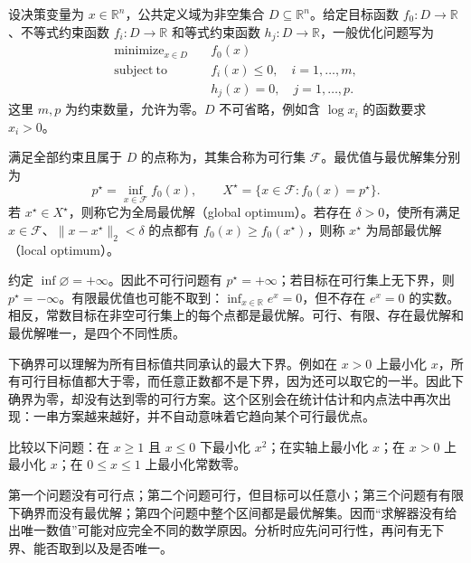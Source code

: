 \documentclass[UTF8,12pt,a4paper,fontset=fandol]{ctexbook}
\begin{document}
设决策变量为 $x\in\mathbb R^n$，公共定义域为非空集合 $D\subseteq\mathbb R^n$。给定目标函数 $f_0:D\to\mathbb R$、不等式约束函数 $f_i:D\to\mathbb R$ 和等式约束函数 $h_j:D\to\mathbb R$，一般优化问题写为
\begin{equation}
 \begin{aligned}
 \mathop{\mathrm{minimize}}_{x\in D}\quad &f_0(x)\\
 \mathrm{subject\ to}\quad &f_i(x)\leq0,\quad i=1,\ldots,m,\\
 &h_j(x)=0,\quad j=1,\ldots,p.
 \end{aligned}
 \label{eq:co-general-problem}
\end{equation}
这里 $m,p$ 为约束数量，允许为零。$D$ 不可省略，例如含 $\log x_i$ 的函数要求 $x_i>0$。

\begin{definition}
满足全部约束且属于 $D$ 的点称为，其集合称为可行集 $\mathcal F$。最优值与最优解集分别为
\[
 p^\star=\inf_{x\in\mathcal F}f_0(x),\qquad
 X^\star=\{x\in\mathcal F:f_0(x)=p^\star\}.
\]
若 $x^\star\in X^\star$，则称它为全局最优解（global optimum）。若存在 $\delta>0$，使所有满足 $x\in\mathcal F$、$\|x-x^\star\|_2<\delta$ 的点都有 $f_0(x)\geq f_0(x^\star)$，则称 $x^\star$ 为局部最优解（local optimum）。
\end{definition}

约定 $\inf\varnothing=+\infty$。因此不可行问题有 $p^\star=+\infty$；若目标在可行集上无下界，则 $p^\star=-\infty$。有限最优值也可能不取到：$\inf_{x\in\mathbb R}e^x=0$，但不存在 $e^x=0$ 的实数。相反，常数目标在非空可行集上的每个点都是最优解。可行、有限、存在最优解和最优解唯一，是四个不同性质。

下确界可以理解为所有目标值共同承认的最大下界。例如在 $x>0$ 上最小化 $x$，所有可行目标值都大于零，而任意正数都不是下界，因为还可以取它的一半。因此下确界为零，却没有达到零的可行方案。这个区别会在统计估计和内点法中再次出现：一串方案越来越好，并不自动意味着它趋向某个可行最优点。

\begin{example}[四种问题状态]
比较以下问题：在 $x\geq1$ 且 $x\leq0$ 下最小化 $x^2$；在实轴上最小化 $x$；在 $x>0$ 上最小化 $x$；在 $0\leq x\leq1$ 上最小化常数零。
\end{example}
\begin{solve}
第一个问题没有可行点；第二个问题可行，但目标可以任意小；第三个问题有有限下确界而没有最优解；第四个问题中整个区间都是最优解集。因而“求解器没有给出唯一数值”可能对应完全不同的数学原因。分析时应先问可行性，再问有无下界、能否取到以及是否唯一。
\end{solve}
\end{document}
